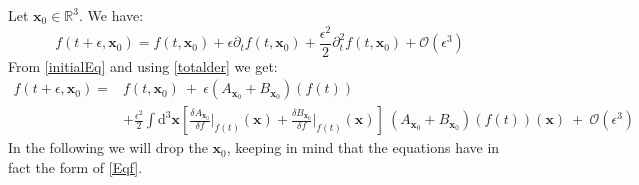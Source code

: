 \documentclass[11pt]{article}
\newcommand{\fder}[2]{\frac{\delta #1}{\delta f}\Bigr|_{#2}}
\begin{document}
Let $\mathbf{x}_0\in\mathbb{R}^3$. We have:
$$f(t+\epsilon,\mathbf{x}_0)=f(t,\mathbf{x}_0)+\epsilon\partial_t f(t,\mathbf{x}_0)+\frac{\epsilon^2}{2}\partial_t^2 f(t,\mathbf{x}_0)+\mathcal{O}(\epsilon^3)$$
From \eqref{initialEq} and using \eqref{totalder} we get:
\begin{equation}\label{Eqf}
    \begin{split}
    f(t+\epsilon,\mathbf{x}_0)=&f(t,\mathbf{x}_0)~+~\epsilon (A_{\mathbf{x}_0}+B_{\mathbf{x}_0})(f(t))\\
    &+\frac{\epsilon^2}{2}\int \text{d}^3\mathbf{x}\left[ \fder{A_{\mathbf{x}_0}}{f(t)}(\mathbf{x})+\fder{B_{\mathbf{x}_0}}{f(t)}(\mathbf{x}) \right]~ (A_{\mathbf{x}_0}+B_{\mathbf{x}_0})(f(t))(\mathbf{x}) ~+~\mathcal{O}(\epsilon^3)
    \end{split}
\end{equation}
In the following we will drop the $\mathbf{x}_0$, keeping in mind that the equations have in fact the form of \eqref{Eqf}.\par
\end{document}
